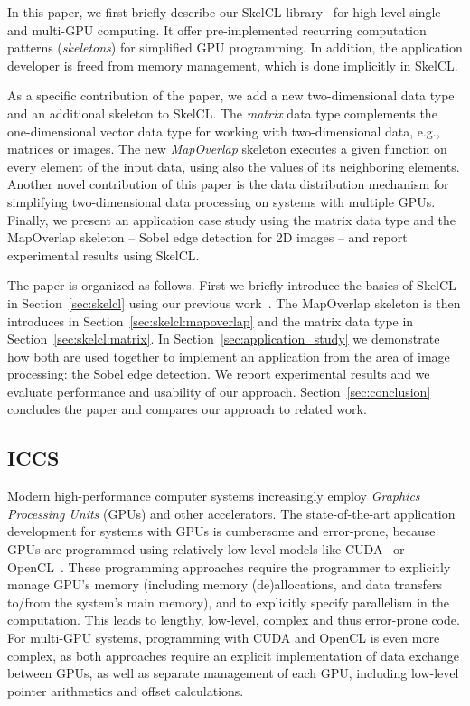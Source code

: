 In this paper, we first briefly describe our SkelCL library~\cite{StKG-11} for high-level single- and multi-GPU computing.
It offer pre-implemented recurring computation patterns (\emph{skeletons}) for simplified GPU programming.
In addition, the application developer is freed from memory management, which is done implicitly in SkelCL.

As a specific contribution of the paper, we add a new two-dimensional data type and an additional skeleton to SkelCL.
The \emph{matrix} data type complements the one-dimensional vector data type for working with two-dimensional data, e.g., matrices or images.
The new \emph{MapOverlap} skeleton executes a given function on every element of the input data, using also the values of its neighboring elements.
Another novel contribution of this paper is the data distribution mechanism for simplifying two-dimensional data processing on systems with multiple GPUs.
Finally, we present an application case study using the matrix data type and the MapOverlap skeleton -- Sobel edge detection for 2D images -- and report experimental results using SkelCL.

The paper is organized as follows.
First we briefly introduce the basics of SkelCL in Section~\ref{sec:skelcl} using our previous work~\cite{StKG-11}.
The MapOverlap skeleton is then introduces in Section~\ref{sec:skelcl:mapoverlap} and the matrix data type in Section~\ref{sec:skelcl:matrix}.
In Section~\ref{sec:application_study} we demonstrate how both are used together to implement an application from the area of image processing: the Sobel edge detection.
We report experimental results and we evaluate performance and usability of our approach.
Section~\ref{sec:conclusion} concludes the paper and compares our approach to related work.


\subsection{ICCS}
Modern high-performance computer systems increasingly employ \emph{Graphics Processing Units} (GPUs) and other accelerators.
The state-of-the-art application development for systems with GPUs is cumbersome and error-prone, because GPUs are programmed using relatively low-level models like CUDA~\cite{CUDA-11} or OpenCL~\cite{OpenCL-10}.
These programming approaches require the programmer to explicitly manage GPU's memory (including memory (de)allocations, and data transfers to/from the system's main memory), and to explicitly specify parallelism in the computation.
This leads to lengthy, low-level, complex and thus error-prone code.
For multi-GPU systems, programming with CUDA and OpenCL is even more complex, as both approaches require an explicit implementation of data exchange between GPUs, as well as separate management of each GPU, including low-level pointer arithmetics and offset calculations.

